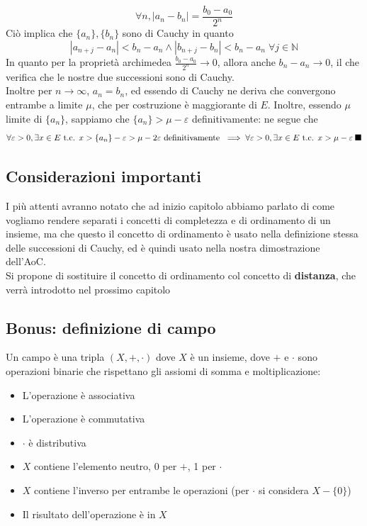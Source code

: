 \documentclass{article}
\newcommand{\qed}{\rule{0.7em}{0.7em}}
\begin{document}
            $$\forall n, |a_n - b_n| = \frac{b_0 - a_0}{2^n}$$
            Ciò implica che $\{a_n\},\{b_n\}$ sono di Cauchy in quanto 
            $$|a_{n+j} - a_n| < b_n - a_n \land |b_{n+j} - b_n| < b_n - a_n \; \forall j \in \mathbb{N}$$
            In quanto per la proprietà archimedea $\frac{b_0 - a_0}{2^n} \to 0$, allora anche $b_n - a_n \to 0$, il che 
            verifica che le nostre due successioni sono di Cauchy. \\
            Inoltre per $n \to \infty$, $a_n = b_n$, ed essendo di Cauchy ne deriva che convergono entrambe a limite $\mu$, che 
            per costruzione è maggiorante di $E$.
            Inoltre, essendo $\mu$ limite di $\{a_n\}$, sappiamo che $\{a_n\} > \mu - \varepsilon$ definitivamente:
            ne segue che 
            $$\forall \varepsilon > 0, \exists x \in E \textrm{ t.c. } x > \{a_n\} - \varepsilon > \mu - 2\varepsilon
                \textrm{ definitivamente }\implies \forall \varepsilon > 0, \exists x \in E \textrm{ t.c. } x > \mu - \varepsilon \; \qed$$
        \subsection{Considerazioni importanti}
            I più attenti avranno notato che ad inizio capitolo abbiamo parlato di come vogliamo 
            rendere separati i concetti di completezza e di ordinamento di un insieme, ma che 
            questo il concetto di ordinamento è usato nella definizione stessa delle successioni di 
            Cauchy, ed è quindi usato nella nostra dimostrazione dell'AoC. \\
            Si propone di sostituire il concetto di ordinamento col concetto di \textbf{distanza}, che 
            verrà introdotto nel prossimo capitolo 
        \subsection{Bonus: definizione di campo}
            Un campo è una tripla $\left(X, +, \cdot\right)$ dove $X$ è un insieme, 
            dove $+$ e $\cdot$  sono operazioni binarie che rispettano gli assiomi di somma e moltiplicazione:
            \begin{itemize}
                \item L'operazione è associativa
                \item L'operazione è commutativa
                \item $\cdot$ è distributiva
                \item $X$ contiene l'elemento neutro, 0 per $+$, 1 per $\cdot$
                \item $X$ contiene l'inverso per entrambe le operazioni (per $\cdot$ si considera $X - \{0\}$)
                \item Il risultato dell'operazione è in $X$
            \end{itemize}
\newpage
\end{document}

